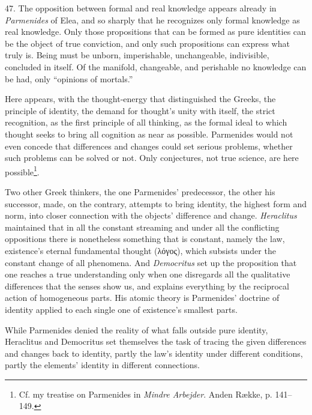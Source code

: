 \documentclass[12pt,a4paper]{book}
\newcommand{\opage}[1]{\marginnote{\footnotesize\textit{[#1]}}}
\begin{document}
47. The opposition between formal and real knowledge appears already in
\emph{Parmenides} of Elea, and so sharply that he recognizes only formal
knowledge as real knowledge. Only those propositions that can be formed as
pure identities can be the object of true conviction, and only such
propositions can express what truly is. Being must be unborn, imperishable,
unchangeable, indivisible, concluded in itself. Of the manifold,
changeable, and perishable no knowledge can be had, only ``opinions of
mortals.''

Here appears, with the thought-energy that distinguished the Greeks, the
principle of identity, the demand for thought's unity with itself, the
strict recognition, as the first principle of all thinking, as the formal
ideal to which thought seeks to bring all cognition as near as possible.
Parmenides would not even concede that differences and changes could set
serious problems, whether such problems can be solved or not. Only
conjectures, not true science, are here possible\footnote{Cf. my treatise
on Parmenides in \emph{Mindre Arbejder}. Anden Række, p. 141--149.}.

Two other Greek thinkers, the one Parmenides' predecessor, the other his
successor, made, on the contrary, attempts to bring identity, the highest
form and norm, into closer connection with the objects' difference and
change. \emph{Heraclitus} maintained that in all the constant streaming and
under all the conflicting oppositions there is nonetheless something that is
constant, namely the law, existence's eternal fundamental thought \opage{125}(λόγος),
which subsists under the constant change of all phenomena. And
\emph{Democritus} set up the proposition that one reaches a true
understanding only when one disregards all the qualitative differences that
the senses show us, and explains everything by the reciprocal action of
homogeneous parts. His atomic theory is Parmenides' doctrine of identity
applied to each single one of existence's smallest parts.

While Parmenides denied the reality of what falls outside pure identity,
Heraclitus and Democritus set themselves the task of tracing the given
differences and changes back to identity, partly the law's identity under
different conditions, partly the elements' identity in different
connections.
\end{document}
